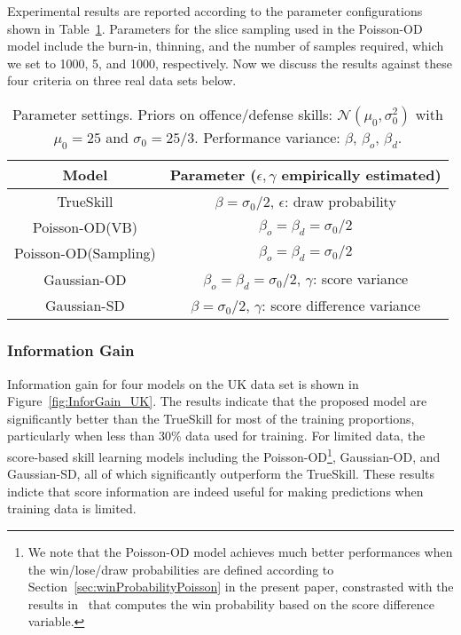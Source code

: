 Experimental results are reported according to the parameter
configurations shown in Table~\ref{table:Parameters}. Parameters for the slice sampling used in the Poisson-OD model include the burn-in, thinning, and the number of samples required, which we set to 1000, 5, and 1000, respectively. 
Now we discuss the results against these four criteria on three real data sets below. 
\begin{table}[htbp!]
\caption{Parameter settings. Priors on offence/defense skills: $\mathcal{N}(\mu_{0},\sigma_{0}^2)$ with $\mu_{0}=25$ and $\sigma_{0}=25/3$. Performance variance: $\beta$, $\beta_o$, $\beta_d$.}
\begin{center}
\small
\begin{tabular}{cc}
  \hline
  Model             & Parameter ($\epsilon,\gamma$ empirically estimated)\\
  \hline
  TrueSkill          & $\beta=\sigma_{0}/2$, $\epsilon$: draw probability\\
  Poisson-OD(VB)         & $\beta_o=\beta_d=\sigma_{0}/2$\\
  Poisson-OD(Sampling)         & $\beta_o=\beta_d=\sigma_{0}/2$\\
  Gaussian-OD    & $\beta_o=\beta_d=\sigma_{0}/2$, $\gamma$: score variance\\
  Gaussian-SD & $\beta=\sigma_{0}/2$, $\gamma$: score difference variance\\
  \hline
\end{tabular}
\label{table:Parameters}
\end{center}
\end{table}

\subsubsection{Information Gain}
Information gain for four models on the UK data set is shown in Figure~\ref{fig:InforGain_UK}. The results indicate that the proposed model are significantly better than the TrueSkill for most of the training proportions, particularly when less than 30\% data used for training. For limited data, the score-based skill learning models including the Poisson-OD\footnote{We note that the Poisson-OD model achieves much better performances when the win/lose/draw probabilities  are defined according to Section~\ref{sec:winProbabilityPoisson} in the present paper, constrasted with the results in~\cite{Guo:ECML2012} that computes the win probability based on the score difference variable.}, Gaussian-OD, and Gaussian-SD, all of which significantly outperform the TrueSkill. These results indicte that score information are indeed useful for making predictions when training data is limited. 

